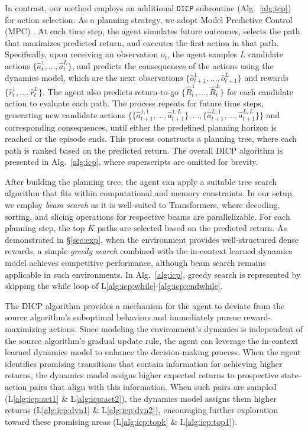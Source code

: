 \documentclass{article}
\begin{document}
In contrast, our method employs an additional \texttt{DICP} subroutine (Alg.~\ref{alg:icp}) for action selection.
As a planning strategy, we adopt Model Predictive Control (MPC) \citep{MB-MPC, ReBAL, GP}.
At each time step, the agent simulates future outcomes, selects the path that maximizes predicted return, and executes the first action in that path.
Specifically, upon receiving an observation $o_t$, the agent samples $L$ candidate actions $\{\hat{a}_t^1, \dots, \hat{a}_t^L\}$, and predicts the consequences of the actions using the dynamics model, which are the next observations $\{\hat{o}_{t+1}^1, \dots, \hat{o}_{t+1}^L\}$ and rewards $\{\hat{r}_t^1, \dots, \hat{r}_t^L\}$.
The agent also predicts return-to-go $\{\hat{R}_t^1, \dots, \hat{R}_t^L\}$ for each candidate action to evaluate each path.
The process repeats for future time steps, generating new candidate actions $\{\{\hat{a}_{t+1}^{1,1}, \dots, \hat{a}_{t+1}^{1,L}\}, \dots, \{\hat{a}_{t+1}^{L,1}, \dots, \hat{a}_{t+1}^{L,L}\}\}$ and corresponding consequences, until either the predefined planning horizon is reached or the episode ends.
This process constructs a planning tree, where each path is ranked based on the predicted return.
The overall DICP algorithm is presented in Alg.~\ref{alg:icp}, where superscripts are omitted for brevity.

After building the planning tree, the agent can apply a suitable tree search algorithm that fits within computational and memory constraints.
In our setup, we employ \emph{beam search} as it is well-suited to Transformers, where decoding, sorting, and slicing operations for respective beams are parallelizable.
For each planning step, the top $K$ paths are selected based on the predicted return.
As demonstrated in \S\ref{sec:exp}, when the environment provides well-structured dense rewards, a simple \emph{greedy search} combined with the in-context learned dynamics model achieves competitive performance, although beam search remains applicable in such environments.
In Alg.~\ref{alg:icp}, greedy search is represented by skipping the while loop of L\ref{alg:icp:while}-\ref{alg:icp:endwhile}.

The DICP algorithm provides a mechanism for the agent to deviate from the source algorithm's suboptimal behaviors and immediately pursue reward-maximizing actions.
Since modeling the environment's dynamics is independent of the source algorithm's gradual update rule, the agent can leverage the in-context learned dynamics model to enhance the decision-making process.
When the agent identifies promising transitions that contain information for achieving higher returns, the dynamics model assigns higher expected returns to prospective state-action pairs that align with this information.
When such pairs are sampled (L\ref{alg:icp:act1} \& L\ref{alg:icp:act2}), the dynamics model assigns them higher returns (L\ref{alg:icp:dyn1} \& L\ref{alg:icp:dyn2}), encouraging further exploration toward these promising areas (L\ref{alg:icp:topk} \& L\ref{alg:icp:top1}).
\end{document}
